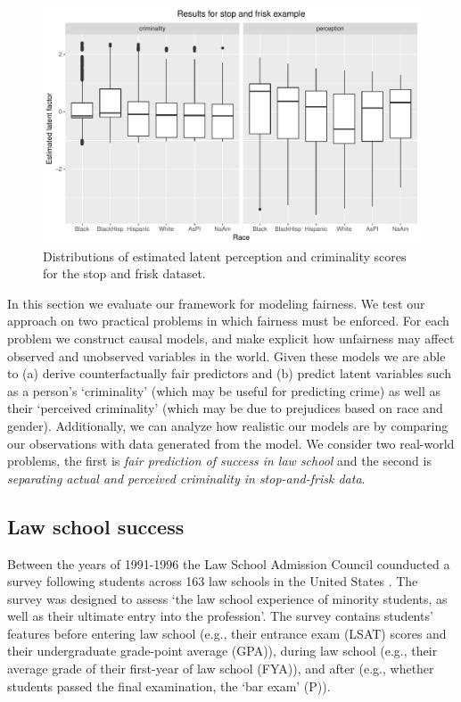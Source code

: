 \begin{figure}[!th]
\begin{center}
\vspace{-1ex}
\centerline{\includegraphics[width=\columnwidth]{stopandfrisk_output.pdf}}
\vspace{-2ex}
\caption{Distributions of estimated latent perception and criminality scores for the stop and frisk dataset.\label{figure.stop_and_frisk_output}}
\vspace{-2ex}
\end{center}
\end{figure}

In this section we evaluate our framework for modeling fairness. We test our approach on two practical problems in which fairness must be enforced. For each problem we construct causal models, and make explicit how unfairness may affect observed and unobserved variables in the world. Given these models we are able to (a) derive counterfactually fair predictors and (b) predict latent variables such as a person's `criminality' (which may be useful for predicting crime) as well as their `perceived criminality' (which may be due to prejudices based on race and gender). Additionally, we can analyze how realistic our models are by comparing our observations with data generated from the model. We consider two real-world problems, the first is \emph{fair prediction of success in law school} and the second is \emph{separating actual and perceived criminality in stop-and-frisk data}.

\subsection{Law school success}
Between the years of 1991-1996 the Law School Admission Council counducted a survey following students across 163 law schools in the United States \cite{wightman1998lsac}. The survey was designed to assess `the law school experience of minority students, as well as their ultimate entry into the profession'. The survey contains students' features before entering law school (e.g., their entrance exam (LSAT) scores and their undergraduate grade-point average (GPA)), during law school (e.g., their average grade of their first-year of law school (FYA)), and after (e.g., whether students passed the final examination, the `bar exam' (P)). 

